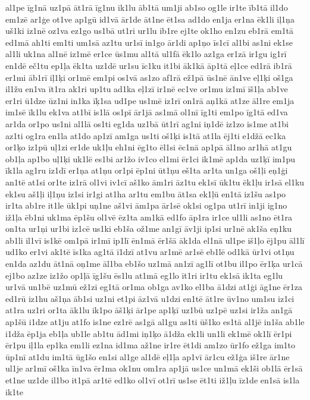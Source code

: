 {al1pe
īg1nā
uz1pā
āt1rā
īg1nu
ik1lu
āb1tā
um1ji
ab1so
og1le
ir1te
īb1tā
il1do
em1zē
ar1ģe
ot1ve
ap1gū
id1vā
ār1de
āt1ne
ēt1sa
ad1do
en1ja
er1na
ēk1li
iļ1ņa
uš1ki
iz1nē
oz1va
ez1go
us1bā
ut1ri
ur1lu
ib1re
ej1te
ok1ho
en1zu
eb1rā
em1tā
ed1mā
ah1ti
em1ti
um1sā
az1tu
ur1sī
in1go
ār1di
ap1ņo
īs1cī
al1bi
as1ni
ek1se
al1li
uk1na
al1nē
iz1mē
er1ce
ūs1mu
al1tā
ul1fā
ēk1lo
az1ga
er1zā
ir1gu
ig1rī
en1dē
eč1tu
ep1ļa
ēk1ta
uz1dē
ur1su
īc1ku
it1bi
āk1kā
āp1tā
eļ1ce
ed1rā
ib1rā
er1mi
āb1rī
iļ1ķi
or1mē
em1pi
os1vā
as1zo
af1rā
ež1pā
ūs1nē
ān1ve
eļ1ķi
oš1ga
il1žu
en1va
īt1ra
ak1ri
up1tu
ad1ka
eļ1zī
ir1nē
ec1ve
or1mu
iz1mī
īš1ļa
ab1ve
er1ri
ū1dze
ūz1ni
in1ka
īķ1sa
ud1pe
us1mē
iz1rī
on1rā
aņ1kā
at1ze
āl1re
em1ja
im1sē
īk1lu
ek1va
at1bī
is1lā
os1pī
ār1jā
as1mā
ol1nī
īg1ti
em1po
īg1tā
ed1va
ar1da
or1po
us1ni
al1lā
os1ti
eg1da
uz1bā
ūt1rī
ag1ni
iņ1dē
iz1zo
is1me
at1bi
az1ti
og1ra
en1la
at1do
ap1zī
am1ga
us1ti
oš1ķi
is1tā
at1la
ēj1ti
e1džā
ec1ka
or1ķo
iz1pū
uļ1zi
er1de
uk1ļu
eh1ni
ēg1to
ēl1si
ēc1nā
ap1pā
āl1no
ar1hā
at1gu
ob1ļa
ap1bo
uļ1ķi
uk1lē
es1bi
ar1žo
iv1co
el1mi
ēr1ci
ik1mē
ap1da
uz1ķī
im1pu
īk1la
ag1ru
iz1dī
er1ņa
at1ņu
or1pi
ēp1ni
ūt1ņu
eš1ta
ar1ta
un1ga
oš1ļi
eņ1ģi
an1tē
at1si
or1te
iz1rā
ol1vi
iv1cī
aš1ko
ām1ri
āz1tu
ek1sī
ūk1tu
ēk1ļu
ir1sā
el1ku
ek1su
aš1ļi
iļ1ņu
iz1si
ir1gi
at1ha
ar1tu
em1bu
āt1sa
ek1ļū
en1tā
iz1šu
as1po
ir1ta
ab1re
it1le
ūk1pi
uņ1ne
aš1vi
ām1pa
ār1sē
ok1si
og1pa
ut1rī
in1ji
ig1no
iž1ļa
ēb1ni
uk1ma
ēp1šu
ol1vē
ēz1ta
am1kā
ed1fo
āp1ra
ir1ce
ul1li
as1no
ēt1ra
on1ta
ur1ņi
ur1bi
iz1cē
us1ki
eb1ša
ož1me
an1gī
āv1ji
ip1si
ur1nē
ak1ša
eņ1ku
ab1li
il1vī
is1kē
om1pā
ir1mī
ip1lī
ēn1mā
ēr1šā
āk1da
el1nā
ul1pe
iš1ļo
ēj1pu
āl1lī
ud1ko
er1vi
ak1tē
īs1ka
ag1tā
ī1dzī
at1vu
ar1mē
ar1sē
eb1lē
od1kā
ūr1vi
ot1ņu
en1da
az1du
āt1nā
oņ1me
āl1ba
eb1šo
uz1mā
an1zī
ag1lī
ot1bu
il1po
ēr1ķa
ur1cā
ej1bo
az1ze
iz1žo
op1ļā
īg1šu
ēs1lu
at1mā
eg1lo
īt1ri
ir1tu
ek1sā
ik1ta
eg1lu
ur1vā
un1bē
uz1mū
ež1zi
eg1tā
or1ma
ob1ga
av1ko
el1ba
ā1dzi
at1ģi
āg1ne
ēr1za
ed1rū
iz1hu
aš1ņa
āb1si
uz1ni
et1pi
āz1vā
u1dzi
en1tē
āt1re
ūv1no
um1su
iz1ci
at1ra
uz1ri
or1ta
āk1lu
ik1po
āš1ķi
ār1pe
ap1ķī
uz1bū
uz1pē
uz1si
ir1ža
an1gā
ap1šū
i1dze
at1ju
at1fo
is1ne
ez1rē
as1gā
al1gu
as1ti
ūš1ko
es1tā
al1jē
in1ša
ab1le
i1dža
ēp1ja
eb1ļa
ub1le
ab1tu
ād1mi
iņ1ķo
ā1dža
ek1li
un1li
ek1mē
ok1lī
ēr1pi
ēr1pu
iļ1la
ep1ka
em1li
ez1na
id1ma
až1ne
ir1re
ēt1di
am1zo
ūr1fo
ež1ga
im1to
ūp1nī
at1du
im1tā
ūg1šo
en1si
al1ge
al1dē
eļ1ļa
ap1vī
ār1cu
ež1ģa
iš1re
ār1ne
ul1je
ar1mī
oš1ka
īn1va
ēr1ma
ok1nu
om1ra
ap1jā
us1ce
un1mā
ek1ši
ob1lā
ēr1sā
et1ne
uz1de
il1bo
it1pā
ar1tē
ed1ko
ol1vī
ot1rī
us1se
ēt1ti
iž1ļu
īz1de
en1sā
is1la
ik1te
}
